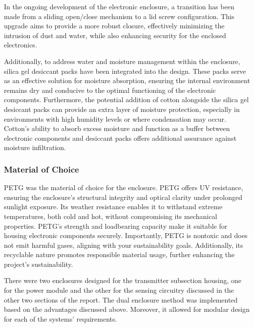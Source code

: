 \documentclass[class=report,11pt,crop=false]{standalone}
\begin{document}
 
In the ongoing development of the electronic enclosure, a transition has been made from a sliding open/close mechanism to a lid screw configuration. This upgrade aims to provide a more robust closure, effectively minimizing the intrusion of dust and water, while also enhancing security for the enclosed electronics.
\newline

Additionally, to address water and moisture management within the enclosure, silica gel desiccant packs have been integrated into the design. These packs serve as an effective solution for moisture absorption, ensuring the internal environment remains dry and conducive to the optimal functioning of the electronic components. Furthermore, the potential addition of cotton alongside the silica gel desiccant packs can provide an extra layer of moisture protection, especially in environments with high humidity levels or where condensation may occur. Cotton's ability to absorb excess moisture and function as a buffer between electronic components and desiccant packs offers additional assurance against moisture infiltration.
\newline

\subsubsection{Material of Choice}
PETG was the material of choice for the enclosure. PETG offers UV resistance, ensuring the enclosure's structural integrity and optical clarity under prolonged sunlight exposure. Its weather resistance enables it to withstand extreme temperatures, both cold and hot, without compromising its mechanical properties. PETG's strength and loadbearing capacity make it suitable for housing electronic components securely. Importantly, PETG is nontoxic and does not emit harmful gases, aligning with your sustainability goals. Additionally, its recyclable nature promotes responsible material usage, further enhancing the project's sustainability. 
\newline

There were two enclosures designed for the transmitter subsection housing, one for the power module and the other for the sensing circuitry discussed in the other two sections of the report. The dual enclosure method was implemented based on the advantages discussed above. Moreover, it allowed for modular design for each of the systems’ requirements. 
\newline
\end{document}
